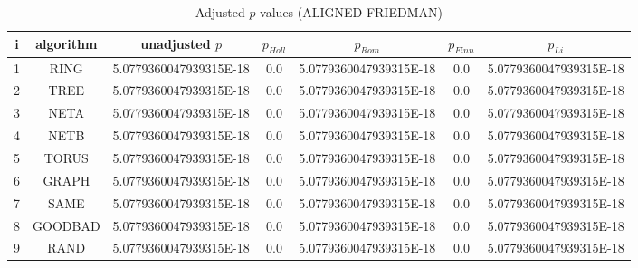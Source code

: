 \documentclass[a4paper,10pt]{article}
\begin{document}
\begin{landscape}
\begin{table}[!htp]
\centering\scriptsize
\caption{Adjusted $p$-values (ALIGNED FRIEDMAN)}
\begin{tabular}{ccccccc}
i&algorithm&unadjusted $p$&$p_{Holl}$&$p_{Rom}$&$p_{Finn}$&$p_{Li}$\\
\hline
1& RING&5.0779360047939315E-18&0.0&5.0779360047939315E-18&0.0&5.0779360047939315E-18\\
2& TREE&5.0779360047939315E-18&0.0&5.0779360047939315E-18&0.0&5.0779360047939315E-18\\
3& NETA&5.0779360047939315E-18&0.0&5.0779360047939315E-18&0.0&5.0779360047939315E-18\\
4& NETB&5.0779360047939315E-18&0.0&5.0779360047939315E-18&0.0&5.0779360047939315E-18\\
5& TORUS&5.0779360047939315E-18&0.0&5.0779360047939315E-18&0.0&5.0779360047939315E-18\\
6& GRAPH&5.0779360047939315E-18&0.0&5.0779360047939315E-18&0.0&5.0779360047939315E-18\\
7& SAME&5.0779360047939315E-18&0.0&5.0779360047939315E-18&0.0&5.0779360047939315E-18\\
8& GOODBAD&5.0779360047939315E-18&0.0&5.0779360047939315E-18&0.0&5.0779360047939315E-18\\
9& RAND&5.0779360047939315E-18&0.0&5.0779360047939315E-18&0.0&5.0779360047939315E-18\\
\hline
\end{tabular}
\end{table}


\newpage


\end{landscape}
\end{document}

